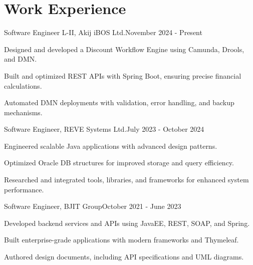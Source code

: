 \section{\textbf{Work Experience}}
\begin{joblong}
{Software Engineer L-II, Akij iBOS Ltd.}{November 2024 - Present}
    \item Designed and developed a Discount Workflow Engine using Camunda, Drools, and DMN.
    \item Built and optimized REST APIs with Spring Boot, ensuring precise financial calculations.
    \item Automated DMN deployments with validation, error handling, and backup mechanisms.
\end{joblong}

\begin{joblong}
{Software Engineer, REVE Systems Ltd.}{July 2023 - October 2024}
    \item Engineered scalable Java applications with advanced design patterns.
    \item Optimized Oracle DB structures for improved storage and query efficiency.
    \item Researched and integrated tools, libraries, and frameworks for enhanced system performance.
\end{joblong}

\begin{joblong}
{Software Engineer, BJIT Group}{October 2021 - June 2023}
    \item Developed backend services and APIs using JavaEE, REST, SOAP, and Spring.
    \item Built enterprise-grade applications with modern frameworks and Thymeleaf.
    \item Authored design documents, including API specifications and UML diagrams.
\end{joblong}
